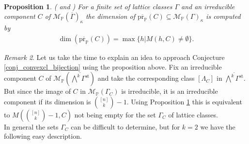 \documentclass[11pt,a4paper]{amsart}
\newtheorem{prop}{Proposition}[section]
\theoremstyle{definition}
\theoremstyle{remark}
\newtheorem{rem}[prop]{Remark}
\newcommand{\Projsp}{\mathbb{P}}
\newcommand{\res}{\kappa}
\newcommand{\M}[1]{\mathcal{M}_{\Projsp}\left(#1\right)}
\newcommand{\projbar}{\mathrm{\overline{\pr_{\Projsp}}}}
\newcommand{\pr}{\mathrm{pr}}
\begin{document}
\begin{prop}(\cite{Li18} and  \cite[Theorem 2.18]{AL17})
\label{prop_dimension_computed_with_subsets}
	For a finite set of lattice classes $\Gamma$ and an irreducible component $C$ of $\M{\overline{\Gamma}}_{\res}$ the dimension of $\projbar (C)\subseteq \M{{\Gamma}}_{\res}$ is computed by
	\begin{align*}
		\dim(\projbar (C))= \max\{h\vert M(h,C)\neq \emptyset \}.
	\end{align*} 
\end{prop}

\begin{rem}
\label{rem_idea_proof_conjecture}
	Let us take the time to explain an idea to approach Conjecture \ref{conj_convexcl_bijection} using the proposition above. Fix an irreducible component $C$ of $\M{\overline{\bigwedge^k\Gamma^{\mathrm{st}}}}$ and take the corresponding class $[\Lambda_C]$ in $\overline{\bigwedge^k\Gamma^{\mathrm{st}}}$. 
	 \\
	But since the image of $C$ in $\M{\Gamma_C}$ is irreducible, it is an irreducible component if its dimension is $\binom{[n]}{k}-1$. Using Proposition \ref{prop_dimension_computed_with_subsets} this is equivalent to $M(\binom{[n]}{k}-1,C)$ not being empty for the set $\Gamma_C$ of lattice classes.\\
	In general the sets $\Gamma_C$ can be difficult to determine, but for $k=2$ we have the following easy description. 
	\end{rem}
\end{document}
